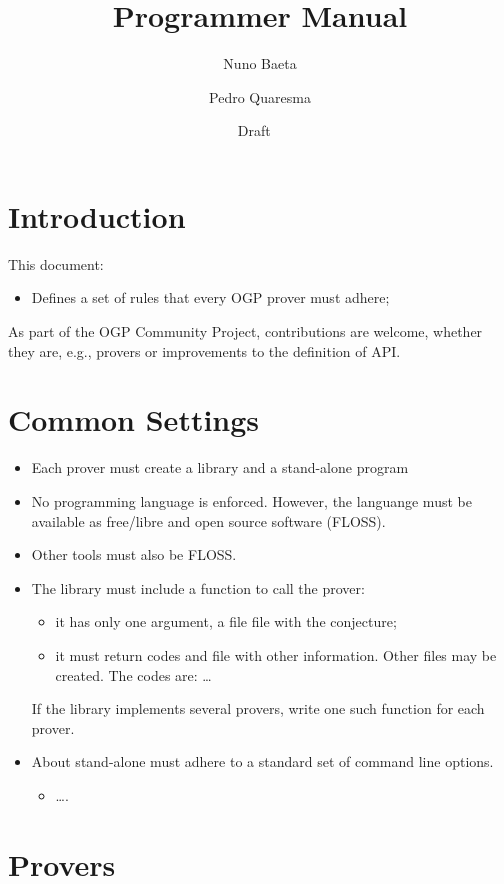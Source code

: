 \documentclass{report}
\title{\OGP \linebreak Programmer Manual}
\author{Nuno Baeta \and Pedro Quaresma}
\date{Draft \DTMtoday \ \DTMcurrenttime}
\begin{document}
\maketitle

\tableofcontents

\chapter{Introduction}
\label{chap:introduction}

This document:
\begin{itemize}
\item Defines a set of rules that every OGP prover must adhere;
\end{itemize}

As part of the OGP Community Project, contributions are welcome, whether
they are, e.g., provers or improvements to the definition of API.

\chapter{Common Settings}
\label{chap:commonsettings}

\begin{itemize}
\item Each prover must create a library and a stand-alone program
\item No programming language is enforced.  However, the languange must
  be available as free/libre and open source software (FLOSS).
\item Other tools must also be FLOSS.
\item The library must include a function to call the prover:
  \begin{itemize}
  \item it has only one argument, a file file with the conjecture;
  \item it must return codes and file with other information.  Other files may
    be created. The codes are: \ldots
  \end{itemize}
  If the library implements several provers, write one such function for
  each prover.
\item About stand-alone must adhere to a standard set of command line
  options.
  \begin{itemize}
  \item \ldots.
  \end{itemize}
\end{itemize}

\chapter{Provers}
\label{chap:provers}
\end{document}
